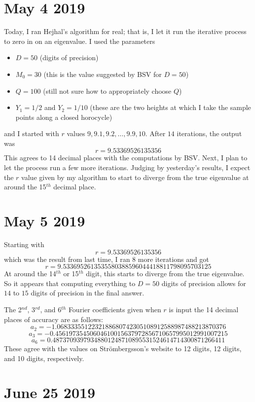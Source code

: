 \documentclass[]{article}
\begin{document}
\section*{May 4 2019}

Today, I ran Hejhal's algorithm for real; that is, I let it run the iterative process to zero in on an eigenvalue.
I used the parameters
\begin{itemize}
	\item $D = 50$ (digits of precision)
	\item $M_0 = 30$ (this is the value suggested by BSV for $D = 50$)
	\item $Q = 100$ (still not sure how to appropriately choose $Q$)
	\item $Y_1 = 1/2$ and $Y_2 = 1/10$ (these are the two heights at which I take the sample points along a closed horocycle)
\end{itemize}
and I started with $r$ values $9, 9.1, 9.2, \dots, 9.9, 10$.
After $14$ iterations, the output was
$$
r = 9.53369526135356
$$
This agrees to 14 decimal places with the computations by BSV.
Next, I plan to let the process run a few more iterations.
Judging by yesterday's results, I expect the $r$ value given by my algorithm to start to diverge from the true eigenvalue at around the 15$^{th}$ decimal place.

\section*{May 5 2019}

Starting with
$$
r = 9.53369526135356
$$
which was the result from last time, I ran $8$ more iterations and got
$$
r = 9.5336952613535580388596044418811798095703125
$$
At around the 14$^{th}$ or 15$^{th}$ digit, this starts to diverge from the true eigenvalue.
So it appears that computing everything to $D = 50$ digits of precision allows for $14$ to $15$ digits of precision in the final answer.

The 2$^{nd}$, 3$^{rd}$, and 6$^{th}$ Fourier coefficients given when $r$ is input the 14 decimal places of accuracy are as follows:
$$
a_2 = -1.0683335512232188680742305108912588987488213870376 $$$$
a_3 = -0.45619735450604610015637972856710657995012991007215 $$$$
a_6 = 0.48737093979348801248710895531524614714300871266411
$$
These agree with the values on Str\"ombergsson's website to 12 digits, 12 digits, and 10 digits, respectively.

\section*{June 25 2019}
\end{document}
